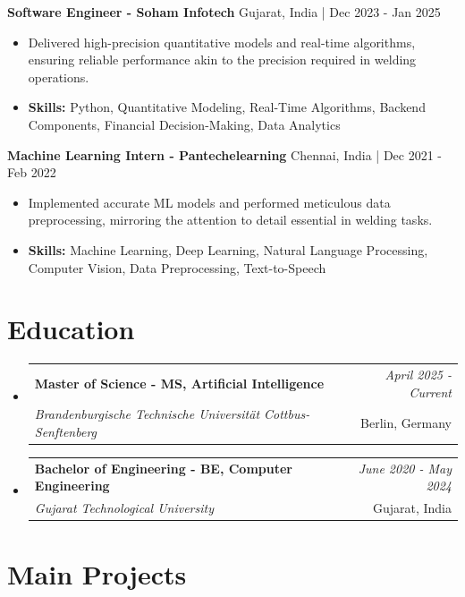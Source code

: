 \documentclass[a4paper,11pt]{article}
\makeatletter
\newcommand{\resumeSubheading}[4]{
\vspace{0.5mm}\item
    \begin{tabular*}{\linewidth}[t]{l@{\extracolsep{\fill}}r}
        \textbf{#1} & \textit{\footnotesize{#4}} \\
        \textit{\footnotesize{#3}} &  \footnotesize{#2}\\
    \end{tabular*}
    \vspace{-2.4mm}
}
\makeatother
\begin{document}
\vspace{1mm}
  \textbf{Software Engineer - Soham Infotech} \hfill Gujarat, India | Dec 2023 - Jan 2025
\vspace{-1.5mm} %
\begin{itemize}
  \item Delivered high-precision quantitative models and real-time algorithms, ensuring reliable performance akin to the precision required in welding operations.

\vspace{-2mm}
  \item \textbf{Skills:} Python, Quantitative Modeling, Real-Time Algorithms, Backend Components, Financial Decision-Making, Data Analytics
\end{itemize}

\vspace{1mm}
  \textbf{Machine Learning Intern - Pantechelearning} \hfill Chennai, India | Dec 2021 - Feb 2022
\vspace{-1.5mm} %
\begin{itemize}
  \item Implemented accurate ML models and performed meticulous data preprocessing, mirroring the attention to detail essential in welding tasks.
\vspace{-2mm}
  \item \textbf{Skills:} Machine Learning, Deep Learning, Natural Language Processing, Computer Vision, Data Preprocessing, Text-to-Speech
\end{itemize}\section{\textbf{Education}}
\vspace{-0.4mm}

\begin{itemize}[leftmargin=0.15in, label={}]
\resumeSubheading
{Master of Science - MS, Artificial Intelligence }{Berlin, Germany}
{Brandenburgische Technische Universität Cottbus-Senftenberg  }{April 2025 - Current}

\vspace{1.0mm} %
\resumeSubheading
{Bachelor of Engineering - BE, Computer Engineering  }{Gujarat, India}
{Gujarat Technological University }{June 2020 - May 2024}

\end{itemize}
\section{\textbf{Main Projects}}
\end{document}
